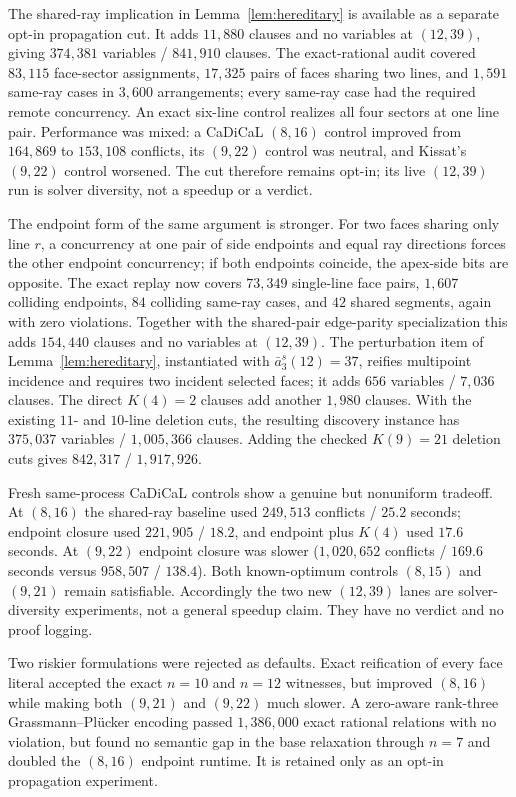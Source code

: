 \documentclass[11pt]{article}
\theoremstyle{definition}
\begin{document}
The shared-ray implication in Lemma~\ref{lem:hereditary} is available as a
separate opt-in propagation cut. It adds $11{,}880$ clauses and no variables
at $(12,39)$, giving $374{,}381$ variables / $841{,}910$ clauses. The
exact-rational audit covered $83{,}115$ face-sector assignments, $17{,}325$
pairs of faces sharing two lines, and $1{,}591$ same-ray cases in $3{,}600$
arrangements; every same-ray case had the required remote concurrency. An
exact six-line control realizes all four sectors at one line pair.
Performance was mixed: a CaDiCaL $(8,16)$ control improved from $164{,}869$
to $153{,}108$ conflicts, its $(9,22)$ control was neutral, and Kissat's
$(9,22)$ control worsened. The cut therefore remains opt-in; its live
$(12,39)$ run is solver diversity, not a speedup or a verdict.

The endpoint form of the same argument is stronger. For two faces sharing
only line $r$, a concurrency at one pair of side endpoints and equal ray
directions forces the other endpoint concurrency; if both endpoints coincide,
the apex-side bits are opposite. The exact replay now covers $73{,}349$
single-line face pairs, $1{,}607$ colliding endpoints, $84$ colliding same-ray
cases, and $42$ shared segments, again with zero violations. Together with
the shared-pair edge-parity specialization this adds $154{,}440$ clauses and
no variables at $(12,39)$. The perturbation item of
Lemma~\ref{lem:hereditary}, instantiated with
$\bar a_3^s(12)=37$, reifies multipoint incidence and requires two incident
selected faces; it adds $656$ variables / $7{,}036$ clauses. The direct
$K(4)=2$ clauses add another $1{,}980$ clauses. With the existing $11$- and
$10$-line deletion cuts, the resulting discovery instance has
$375{,}037$ variables / $1{,}005{,}366$ clauses. Adding the checked
$K(9)=21$ deletion cuts gives $842{,}317$ / $1{,}917{,}926$.

Fresh same-process CaDiCaL controls show a genuine but nonuniform tradeoff.
At $(8,16)$ the shared-ray baseline used $249{,}513$ conflicts / $25.2$
seconds; endpoint closure used $221{,}905$ / $18.2$, and endpoint plus
$K(4)$ used $17.6$ seconds. At $(9,22)$ endpoint closure was slower
($1{,}020{,}652$ conflicts / $169.6$ seconds versus $958{,}507$ / $138.4$).
Both known-optimum controls $(8,15)$ and $(9,21)$ remain satisfiable.
Accordingly the two new $(12,39)$ lanes are solver-diversity experiments, not
a general speedup claim. They have no verdict and no proof logging.

Two riskier formulations were rejected as defaults. Exact reification of
every face literal accepted the exact $n=10$ and $n=12$ witnesses, but improved
$(8,16)$ while making both $(9,21)$ and $(9,22)$ much slower. A zero-aware
rank-three Grassmann--Pl\"ucker encoding passed $1{,}386{,}000$ exact rational
relations with no violation, but found no semantic gap in the base relaxation
through $n=7$ and doubled the $(8,16)$ endpoint runtime. It is retained only
as an opt-in propagation experiment.
\end{document}
